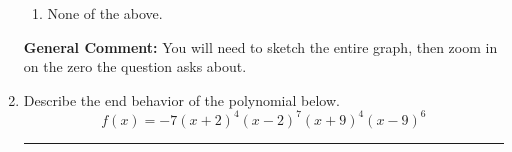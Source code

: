\documentclass{extbook}[14pt]
\newcommand{\litem}[1]{\item #1

\rule{\textwidth}{0.4pt}}
\begin{document}
\begin{enumerate}
{\begin{enumerate}[label=\Alph*.]
\item None of the above.\end{enumerate}
\textbf{General Comment:} You will need to sketch the entire graph, then zoom in on the zero the question asks about.
}
\litem{
Describe the end behavior of the polynomial below.
\[ f(x) = -7(x + 2)^{4}(x - 2)^{7}(x + 9)^{4}(x - 9)^{6} \]

}
\end{enumerate}
\end{document}
